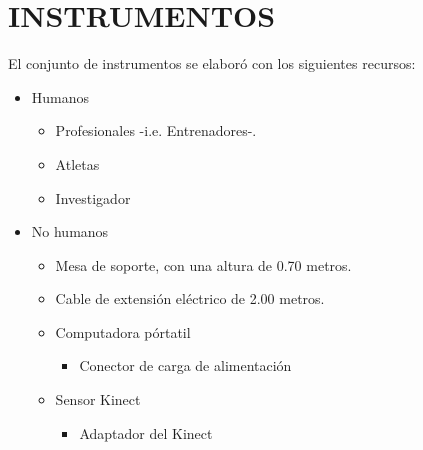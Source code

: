 \section{INSTRUMENTOS}\label{ins}
El conjunto de instrumentos se elabor\'o con los  siguientes recursos:
\begin{itemize}
\item Humanos
	\begin{itemize}
	\item Profesionales -i.e. Entrenadores-.
	\item Atletas
	\item Investigador
	\end{itemize}
\item No humanos
	\begin{itemize}
	\item Mesa de soporte, con una altura de 0.70 metros.
	\item Cable de extensi\'on el\'ectrico de 2.00 metros. 
	\item Computadora p\'ortatil
		\begin{itemize}
		\item Conector de carga de alimentaci\'on
		\end{itemize}
	\item Sensor Kinect
		\begin{itemize}
		\item Adaptador del Kinect
		\end{itemize}
	\end{itemize}
\end{itemize}
